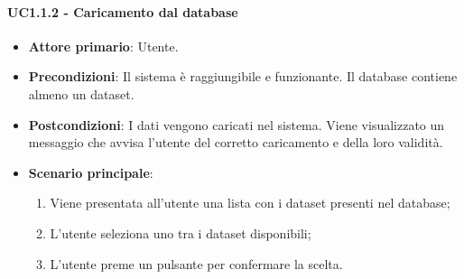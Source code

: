 \paragraph{UC1.1.2 - Caricamento dal database}
\begin{itemize}
	\item \textbf{Attore primario}: Utente.
	\item \textbf{Precondizioni}: Il sistema è raggiungibile e funzionante. Il database contiene almeno un dataset.
	\item \textbf{Postcondizioni}: I dati vengono caricati nel sistema. Viene visualizzato un messaggio che avvisa l'utente del corretto caricamento e della loro validità.
	\item \textbf{Scenario principale}: 
	\begin{enumerate}
			\item Viene presentata all'utente una lista con i dataset presenti nel database;
			\item L'utente seleziona uno tra i dataset disponibili;
			\item L'utente preme un pulsante per confermare la scelta.
		\end{enumerate}
	
\end{itemize}